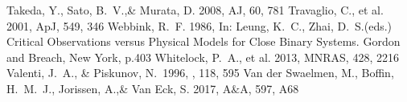 \documentclass[a4paper,fleqn,usenatbib]{mnras}
\begin{document}
\begin{thebibliography}{99}
Takeda, Y., Sato, B.~V.,\& Murata, D. 2008, 
AJ, 60, 781
Travaglio, C., et al. 2001, 
ApJ, 549, 346
Webbink, R.~F. 1986, 
In: Leung, K.~C., Zhai, D.~S.(eds.) Critical Observations versus Physical Models for Close Binary Systems. Gordon and Breach, New York, p.403
Whitelock, P.~A., et al. 2013, 
MNRAS, 428, 2216
 Valenti, J.~A., \& Piskunov, N.\ 1996, \aaps, 118, 595 
Van der Swaelmen, M., Boffin, H.~M.~J., Jorissen, A.,\& Van Eck, S. 2017, 
A$\&$A, 597, A68






\end{thebibliography}


\bsp	%
\label{lastpage}
\end{document}
